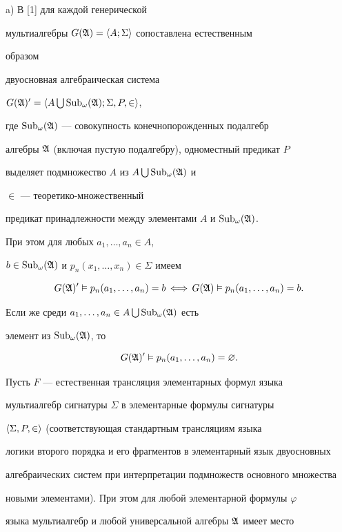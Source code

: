 \begin{pf} 


a) В [1] для каждой генерической 


мультиалгебры $G(\frak A)=\langle A;\Sigma\rangle$ сопоставлена естественным 


образом 


двуосновная алгебраическая система 


$G(\frak A)'=\langle A\bigcup\operatorname{Sub}_\omega(\frak A);\Sigma,P,\in\nobreak\rangle$, 


где $\operatorname{Sub}_\omega(\frak A)$ --- совокупность конечнопорожденных подалгебр 


алгебры $\frak A$ (включая пустую подалгебру), одноместный предикат $P$ 


выделяет подмножество $A$ из $A\bigcup\operatorname{Sub}_\omega(\frak A)$ и 


$\in$ --- теоретико-множественный 


предикат принадлежности между элементами $A$ и $\operatorname{Sub}_\omega(\frak A)$. 


При этом для любых $a_1,\dotsc,a_n\in A$, 


$b\in\operatorname{Sub}_\omega(\frak A)$ и $p_n(x_1,\dotsc,x_n)\in\Sigma$ имеем 


$$ 


G(\frak A)'\vDash p_n(a_1,\dotsc,a_n)=b\,\Longleftrightarrow\, 


G(\frak A)\vDash p_n(a_1,\dotsc,a_n)=b. 


$$ 


Если же среди $a_1,\dotsc,a_n\in A\bigcup\operatorname{Sub}_\omega(\frak A)$ есть 


элемент из $\operatorname{Sub}_\omega(\frak A)$, то 


$$ 


G(\frak A)'\vDash p_n(a_1,\dotsc,a_n)=\varnothing. 


$$ 


Пусть $F$ --- естественная трансляция элементарных формул языка 


мультиалгебр сигнатуры $\Sigma$ в элементарные формулы сигнатуры 


$\langle\Sigma,P,\in\rangle$ (соответствующая стандартным трансляциям языка 


логики второго порядка и его фрагментов в элементарный язык двуосновных 


алгебраических систем при интерпретации подмножеств основного множества 


новыми элементами). При этом для любой элементарной формулы $\varphi$ 


языка мультиалгебр и любой универсальной алгебры $\frak A$ имеет место 



\end{pf}
